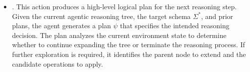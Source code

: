 \begin{itemize}[leftmargin=1em]

    \item {}.
    This action produces a high-level logical plan for the next reasoning step.
    Given the current agentic reasoning tree, the target schema $\Sigma^\ast$, and prior plans, the agent generates a plan $\psi$ that specifies the intended reasoning decision.
    The plan analyzes the current environment state to determine whether to continue expanding the tree or terminate the reasoning process. If further exploration is required, it identifies the parent node to extend and the candidate operations to apply. 


\end{itemize}
